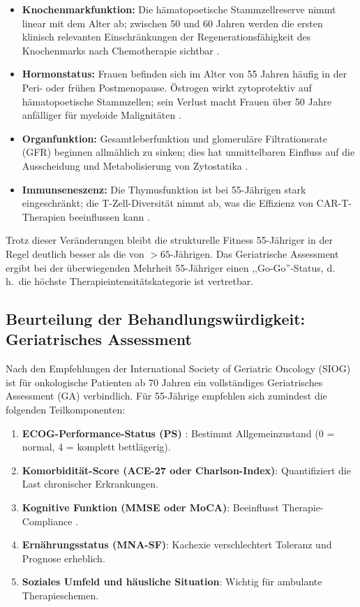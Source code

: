 ﻿\documentclass[12pt,a4paper]{article}
\theoremstyle{definition}
\begin{document}
\begin{itemize}
  \item \textbf{Knochenmarkfunktion:} Die hämatopoetische Stammzellreserve nimmt
        linear mit dem Alter ab; zwischen 50 und 60 Jahren werden die ersten
        klinisch relevanten Einschränkungen der Regenerationsfähigkeit des
        Knochenmarks nach Chemotherapie sichtbar \cite{appelbaum2006}.
  \item \textbf{Hormonstatus:} Frauen befinden sich im Alter von 55 Jahren
        häufig in der Peri- oder frühen Postmenopause. Östrogen wirkt zytoprotektiv
        auf hämatopoetische Stammzellen; sein Verlust macht Frauen über 50 Jahre
        anfälliger für myeloide Malignitäten \cite{cook2009}.
  \item \textbf{Organfunktion:} Gesamtleberfunktion und glomeruläre Filtrationsrate
        (GFR) beginnen allmählich zu sinken; dies hat unmittelbaren Einfluss auf
        die Ausscheidung und Metabolisierung von Zytostatika \cite{extermann2007}.
  \item \textbf{Immunseneszenz:} Die Thymusfunktion ist bei 55-Jährigen stark
        eingeschränkt; die T-Zell-Diversität nimmt ab, was die Effizienz
        von CAR-T-Therapien beeinflussen kann \cite{klepin2013}.
\end{itemize}

Trotz dieser Veränderungen bleibt die strukturelle Fitness 55-Jähriger in der Regel
deutlich besser als die von $>65$-Jährigen. Das Geriatrische Assessment
\cite{wildiers2014} ergibt bei der überwiegenden Mehrheit 55-Jähriger einen
,,Go-Go''-Status, d.\,h.\ die höchste Therapieintensitätskategorie ist vertretbar.

\subsection{Beurteilung der Behandlungswürdigkeit: Geriatrisches Assessment}

Nach den Empfehlungen der International Society of Geriatric Oncology (SIOG)
\cite{wildiers2014} ist für onkologische Patienten ab 70 Jahren ein vollständiges
Geriatrisches Assessment (GA) verbindlich. Für 55-Jährige empfehlen sich zumindest
die folgenden Teilkomponenten:

\begin{enumerate}
  \item \textbf{ECOG-Performance-Status (PS)} \cite{oken1982}: Bestimmt
        Allgemeinzustand (0 = normal, 4 = komplett bettlägerig).
  \item \textbf{Komorbidität-Score (ACE-27 oder Charlson-Index)}: Quantifiziert
        die Last chronischer Erkrankungen.
  \item \textbf{Kognitive Funktion (MMSE oder MoCA)}: Beeinflusst Therapie-
        Compliance \cite{klepin2013}.
  \item \textbf{Ernährungsstatus (MNA-SF)}: Kachexie verschlechtert Toleranz
        und Prognose erheblich.
  \item \textbf{Soziales Umfeld und häusliche Situation}: Wichtig für
        ambulante Therapieschemen.
\end{enumerate}
\end{document}
